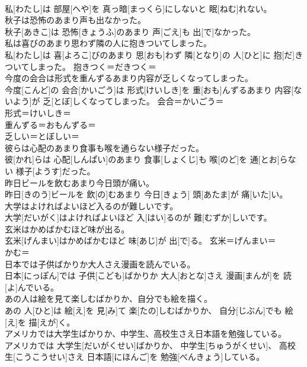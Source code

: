 \documentclass[8pt]{extreport}
\begin{document}
\begin{CJK}{UTF8}{min}
\\	私[わたし]は 部屋[へや]を 真っ暗[まっくら]にしないと 眠[ねむ]れない。	
\\	秋子は恐怖のあまり声も出なかった。	
\\	秋子[あきこ]は 恐怖[きょうふ]のあまり 声[ごえ]も 出[で]なかった。	
\\	私は喜びのあまり思わず隣の人に抱きついてしまった。	
\\	私[わたし]は 喜[よろこ]びのあまり 思[おも]わず 隣[となり]の 人[ひと]に 抱[だ]きついてしまった。	抱きつく＝だきつく＝ 
\\	今度の会合は形式を重んずるあまり内容が乏しくなってしまった。	
\\	今度[こんど]の 会合[かいごう]は 形式[けいしき]を 重[おも]んずるあまり 内容[ないよう]が 乏[とぼ]しくなってしまった。	会合＝かいごう＝ 
\\	形式＝けいしき＝ 
\\	重んずる＝おもんずる＝ 
\\	乏しい＝とぼしい＝ 
\\	彼らは心配のあまり食事も喉を通らない様子だった。	
\\	彼[かれ]らは 心配[しんぱい]のあまり 食事[しょくじ]も 喉[のど]を 通[とお]らない 様子[ようす]だった。	
\\	昨日ビールを飲むあまり今日頭が痛い。	
\\	昨日[きのう]ビールを 飲[の]むあまり 今日[きょう] 頭[あたま]が 痛[いた]い。	
\\	大学はよければよいほど入るのが難しいです。	
\\	大学[だいがく]はよければよいほど 入[はい]るのが 難[むずか]しいです。	
\\	玄米はかめばかむほど味が出る。	
\\	玄米[げんまい]はかめばかむほど 味[あじ]が 出[で]る。	玄米＝げんまい＝ 
\\	かむ＝ 
\\	日本では子供ばかりか大人さえ漫画を読んでいる。	
\\	日本[にっぽん]では 子供[こども]ばかりか 大人[おとな]さえ 漫画[まんが]を 読[よ]んでいる。	
\\	あの人は絵を見て楽しむばかりか、自分でも絵を描く。	
\\	あの 人[ひと]は 絵[え]を 見[み]て 楽[たの]しむばかりか、 自分[じぶん]でも 絵[え]を 描[えが]く。	
\\	アメリカでは大学生ばかりか、中学生、高校生さえ日本語を勉強している。	
\\	アメリカでは 大学生[だいがくせい]ばかりか、 中学生[ちゅうがくせい]、 高校生[こうこうせい]さえ 日本語[にほんご]を 勉強[べんきょう]している。	

\end{CJK}
\end{document}
